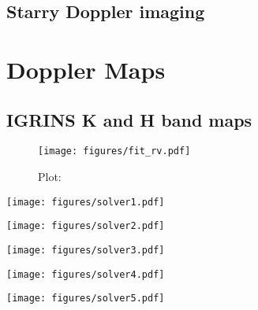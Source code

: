 \documentclass[twocolumn]{aastex631}
\begin{document}
\subsection{Starry Doppler imaging}


\section{Doppler Maps}

\subsection{IGRINS K and H band maps}

\begin{figure}[ht!]
    \begin{centering}
        \texttt{[image: figures/fit\_rv.pdf]}
        \caption{
            Plot: 
        }
        \label{fig:fit_rv}
    \end{centering}
\end{figure}

\begin{figure*}
    \centering
    \begin{minipage}[b]{0.18\textwidth}
        \centering
        \texttt{[image: figures/solver1.pdf]}
        \label{fig:solver1}
     \end{minipage}
     \hfill
     \begin{minipage}[b]{0.18\textwidth}
         \centering
         \texttt{[image: figures/solver2.pdf]}
         \label{fig:solver2}
     \end{minipage}
     \hfill
     \begin{minipage}[b]{0.18\textwidth}
         \centering
         \texttt{[image: figures/solver3.pdf]}
         \label{fig:solver3}
     \end{minipage}
     \hfill
     \begin{minipage}[b]{0.18\textwidth}
         \centering
         \texttt{[image: figures/solver4.pdf]}
         \label{fig:solver4}
     \end{minipage}
     \hfill
     \begin{minipage}[b]{0.18\textwidth}
         \centering
         \texttt{[image: figures/solver5.pdf]}
         \label{fig:solver5}
     \end{minipage}
\end{figure*} 



\end{document}
